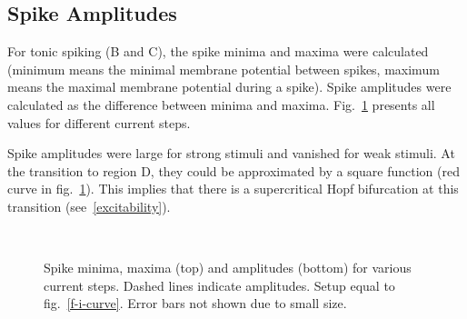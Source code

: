 \documentclass[12pt,a4paper,]{report}
\begin{document}
\subsection{Spike Amplitudes}\label{amplitudes}

For tonic spiking (B and C), the spike minima and maxima were calculated
(minimum means the minimal membrane potential between spikes, maximum
means the maximal membrane potential during a spike). Spike amplitudes
were calculated as the difference between minima and maxima.
Fig.~\ref{minima-maxima-amplitudes} presents all values for different
current steps.

Spike amplitudes were large for strong stimuli and vanished for weak
stimuli. At the transition to region D, they could be approximated by a
square function (red curve in fig.~\ref{minima-maxima-amplitudes}).
This implies that there is a supercritical Hopf bifurcation at this
transition (see~\ref{excitability}).

\begin{figure}
\centering
\captionsetup[subfigure]{labelformat=empty}
\\
\caption[Spike minima, maxima and amplitudes for
various current steps]{Spike minima, maxima (top) and amplitudes (bottom) for
various current steps. Dashed lines indicate amplitudes. Setup equal
to fig.~\ref{f-i-curve}. Error bars not shown due to small
size.}\label{minima-maxima-amplitudes}
\end{figure}
\end{document}
